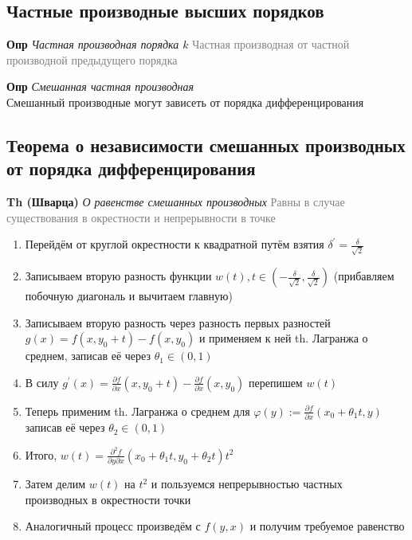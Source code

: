 \subsection{Частные производные высших порядков}

\textbf{Опр} \textit{Частная производная порядка $k$}
\textcolor{gray}{Частная производная от частной производной предыдущего порядка}

\textbf{Опр} \textit{Смешанная частная производная} \\

Смешанный производные могут зависеть от порядка дифференцирования

\subsection{Теорема о независимости смешанных производных от порядка дифференцирования}

\textbf{Th (Шварца)} \textit{О равенстве смешанных производных}
\textcolor{gray}{Равны в случае существования в окрестности и непрерывности в точке}

\begin{enumerate}
    \item Перейдём от круглой окрестности к квадратной путём взятия $\delta^{'} = \frac{\delta}{\sqrt{2}}$
    \item Записываем вторую разность функции $w(t), t \in \left(-\frac{\delta}{\sqrt{2}}, \frac{\delta}{\sqrt{2}}\right)$
    (прибавляем побочную диагональ и вычитаем главную)
    \item Записываем вторую разность через разность первых разностей $g(x) = f(x, y_0 + t) - f(x, y_0)$ и применяем к
    ней th.
    Лагранжа о среднем, записав её через $\theta_1 \in (0, 1)$
    \item В силу $g^{'}(x) = \frac{\partial f}{\partial x} (x, y_0 + t) - \frac{\partial f}{\partial x} (x, y_0)$
    перепишем $w(t)$
    \item Теперь применим th.
    Лагранжа о среднем для $\varphi (y) := \frac{\partial f}{\partial x} (x_0 + \theta_1 t, y)$ записав её через
    $\theta_2 \in (0, 1)$
    \item Итого, $w(t) = \frac{\partial^2 f}{\partial y \partial x} (x_0 + \theta_1 t, y_0 + \theta_2 t)t^2$
    \item Затем делим $w(t)$ на $t^2$ и пользуемся непрерывностью частных производных в окрестности точки
    \item Аналогичный процесс произведём с $f(y, x)$ и получим требуемое равенство
\end{enumerate}

